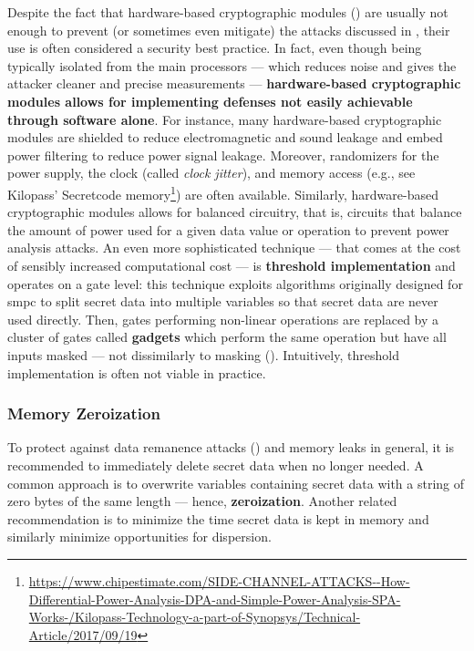 Despite the fact that hardware-based cryptographic modules () are usually not enough to prevent (or sometimes even mitigate) the attacks discussed in , their use is often considered a security best practice. In fact, even though being typically isolated from the main processors --- which reduces noise and gives the attacker cleaner and precise measurements --- \textbf{hardware-based cryptographic modules allows for implementing defenses not easily achievable through software alone}. For instance, many hardware-based cryptographic modules are shielded to reduce electromagnetic and sound leakage and embed power filtering to reduce power signal leakage. Moreover, randomizers for the power supply, the clock (called \textit{clock jitter}), and memory access (e.g., see Kilopass' Secretcode memory\footnote{\url{https://www.chipestimate.com/SIDE-CHANNEL-ATTACKS--How-Differential-Power-Analysis-DPA-and-Simple-Power-Analysis-SPA-Works-/Kilopass-Technology-a-part-of-Synopsys/Technical-Article/2017/09/19}}) are often available. Similarly, hardware-based cryptographic modules allows for balanced circuitry, that is, circuits that balance the amount of power used for a given data value or operation to prevent power analysis attacks. An even more sophisticated technique --- that comes at the cost of sensibly increased computational cost --- is \textbf{threshold implementation} and operates on a gate level: this technique exploits algorithms originally designed for \gls{smpc} 
to split secret data into multiple variables so that secret data are never used directly. Then, gates performing non-linear operations are replaced by a cluster of gates called \textbf{gadgets} which perform the same operation but have all inputs masked --- not dissimilarly to masking (). Intuitively, threshold implementation is often not viable in practice.

\subsubsection{Memory Zeroization}\label{sec:security_of_cryptographic_algorithms:best_practices:zeroization}

To protect against data remanence attacks () and memory leaks in general, it is recommended to immediately delete secret data when no longer needed. A common approach is to overwrite variables containing secret data with a string of zero bytes of the same length --- hence, \textbf{zeroization}. Another related recommendation is to minimize the time secret data is kept in memory and similarly minimize opportunities for dispersion. 

